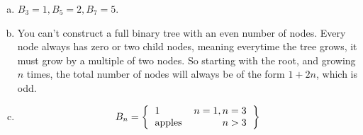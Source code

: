 \documentclass[a4paper,12pt]{article}
\begin{document}
\begin{enumerate}[a)]

\item $B_3 = 1, B_5 = 2, B_7 = 5$.

\item You can't construct a full binary tree with an even number of
  nodes. Every node always has zero or two child nodes, meaning
  everytime the tree grows, it must grow by a multiple of two
  nodes. So starting with the root, and growing $n$ times, the total
  number of nodes will always be of the form $1 + 2n$, which is odd.

\item \[B_n = \left\{
      \begin{tabular}{l r}
        1 & $n=1, n=3$\\
        apples & $n > 3$
      \end{tabular}
      \right\}\]

\end{enumerate}
\end{document}
